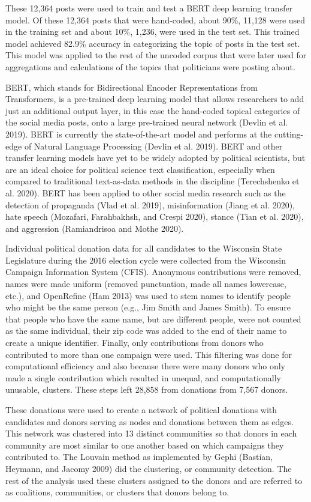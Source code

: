 \documentclass[12pt,]{article}
\begin{document}
These 12,364 posts were used to train and test a BERT deep learning
transfer model. Of these 12,364 posts that were hand-coded, about 90\%,
11,128 were used in the training set and about 10\%, 1,236, were used in
the test set. This trained model achieved 82.9\% accuracy in
categorizing the topic of posts in the test set. This model was applied
to the rest of the uncoded corpus that were later used for aggregations
and calculations of the topics that politicians were posting about.

BERT, which stands for Bidirectional Encoder Representations from
Transformers, is a pre-trained deep learning model that allows
researchers to add just an additional output layer, in this case the
hand-coded topical categories of the social media posts, onto a large
pre-trained neural network (Devlin et al. 2019). BERT is currently the
state-of-the-art model and performs at the cutting-edge of Natural
Language Processing (Devlin et al. 2019). BERT and other transfer
learning models have yet to be widely adopted by political scientists,
but are an ideal choice for political science text classification,
especially when compared to traditional text-as-data methods in the
discipline (Terechshenko et al. 2020). BERT has been applied to other
social media research such as the detection of propaganda (Vlad et al.
2019), misinformation (Jiang et al. 2020), hate speech (Mozafari,
Farahbakhsh, and Crespi 2020), stance (Tian et al. 2020), and aggression
(Ramiandrisoa and Mothe 2020).

Individual political donation data for all candidates to the Wisconsin
State Legislature during the 2016 election cycle were collected from the
Wisconsin Campaign Information System (CFIS). Anonymous contributions
were removed, names were made uniform (removed punctuation, made all
names lowercase, etc.), and OpenRefine (Ham 2013) was used to stem names
to identify people who might be the same person (e.g., Jim Smith and
James Smith). To ensure that people who have the same name, but are
different people, were not counted as the same individual, their zip
code was added to the end of their name to create a unique identifier.
Finally, only contributions from donors who contributed to more than one
campaign were used. This filtering was done for computational efficiency
and also because there were many donors who only made a single
contribution which resulted in unequal, and computationally unusable,
clusters. These steps left 28,858 from donations from 7,567 donors.

These donations were used to create a network of political donations
with candidates and donors serving as nodes and donations between them
as edges. This network was clustered into 13 distinct communities so
that donors in each community are most similar to one another based on
which campaigns they contributed to. The Louvain method as implemented
by Gephi (Bastian, Heymann, and Jacomy 2009) did the clustering, or
community detection. The rest of the analysis used these clusters
assigned to the donors and are referred to as coalitions, communities,
or clusters that donors belong to.
\end{document}
